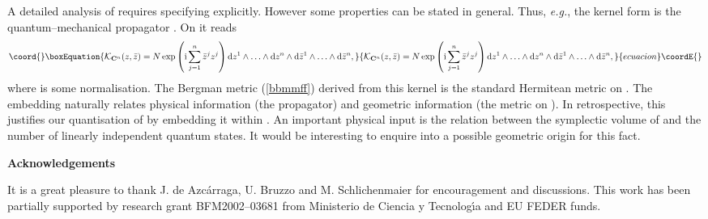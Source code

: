 \documentclass[a4paper,a4paper]{article}
\begin{document}
A detailed analysis of \coordHE{} requires specifying \coordHE{} explicitly.
However some properties can be stated in general. Thus, {\it e.g.},
the kernel form is the quantum--mechanical propagator 
\cite{DR}. On \coordHE{} it reads 
\begin{equation}\coord{}\boxEquation{
{\cal K}_{{\bf C}^n}(z, \bar z) = N \,{\rm exp}\left({\rm i}\sum_{j=1}^n\bar z^j z^j\right)
{\rm d}z^1\wedge\ldots\wedge{\rm d}z^n\wedge{\rm d}\bar z^1\wedge\ldots\wedge{\rm d}\bar z^n,
\label{ceene}
}{
{\cal K}_{{\bf C}^n}(z, \bar z) = N \,{\rm exp}\left({\rm i}\sum_{j=1}^n\bar z^j z^j\right)
{\rm d}z^1\wedge\ldots\wedge{\rm d}z^n\wedge{\rm d}\bar z^1\wedge\ldots\wedge{\rm d}\bar z^n,
}{ecuacion}\coordE{}\end{equation}
where \coordHE{} is some normalisation. The Bergman metric (\ref{bbmmff}) derived from this kernel 
is the standard Hermitean metric on \coordHE{}. The embedding \myHighlight{$\iota$}\coordHE{} naturally relates physical 
information (the propagator) and geometric information (the metric on \coordHE{}). In retrospective, 
this justifies our quantisation of \coordHE{} by embedding it within \coordHE{}. 
An important physical input is the relation between the symplectic volume of \coordHE{} 
and the number of linearly independent quantum states.  It would be 
interesting to enquire into a possible geometric origin for this fact.


{\bf Acknowledgements}


It is a great pleasure to thank J. de Azc\'arraga, U. Bruzzo and M. Schlichenmaier 
for encouragement and discussions. This work has been partially supported by research grant 
BFM2002--03681 from Ministerio de Ciencia y Tecnolog\'{\i}a and EU FEDER funds.
\end{document}
